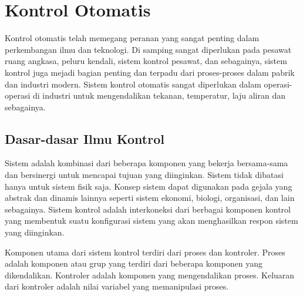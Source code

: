 






\section{Kontrol Otomatis}

Kontrol otomatis telah memegang peranan yang sangat penting dalam perkembangan ilmu dan teknologi. Di samping sangat diperlukan pada pesawat ruang angkasa, peluru kendali, sistem kontrol pesawat, dan sebagainya, sistem kontrol juga mejadi bagian penting dan terpadu dari proses-proses dalam pabrik dan industri modern. Sistem kontrol otomatis sangat diperlukan dalam operasi-operasi di industri untuk mengendalikan tekanan, temperatur, laju aliran dan sebagainya. \cite{ControlSystemBook}

\subsection{Dasar-dasar Ilmu Kontrol}

Sistem adalah kombinasi dari beberapa komponen yang bekerja bersama-sama dan bersinergi untuk mencapai tujuan yang diinginkan. Sistem tidak dibatasi hanya untuk sistem fisik saja. Konsep sistem dapat digunakan pada gejala yang abstrak dan dinamis lainnya seperti sistem ekonomi, biologi, organisasi, dan lain sebagainya. Sistem kontrol adalah interkoneksi dari berbagai komponen kontrol yang membentuk suatu konfigurasi sistem yang akan menghasilkan respon sistem yang diinginkan. \cite{ControlSystemBook}

Komponen utama dari sistem kontrol terdiri dari proses dan kontroler. Proses adalah komponen atau grup yang terdiri dari beberapa komponen yang dikendalikan. Kontroler adalah komponen yang mengendalikan proses. Keluaran dari kontroler adalah nilai variabel yang memanipulasi proses.

